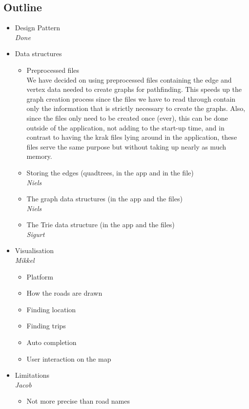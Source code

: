 \documentclass[a4paper,11pt]{article}
\begin{document}
\subsection{Outline}
\begin{itemize}
	\item Design Pattern \\
		\textsl{Done}
	\item Data structures
	\begin{itemize}
		\item Preprocessed files \\
		We have decided on using preprocessed files containing the edge and vertex data needed to create graphs for pathfinding. This speeds up the graph creation process since the files we have to read through contain only the information that is strictly necessary to create the graphs. Also, since the files only need to be created once (ever), this can be done outside of the application, not adding to the start-up time, and in contrast to having the krak files lying around in the application, these files serve the same purpose but without taking up nearly as much memory.
		\item Storing the edges (quadtrees, in the app and in the file) \\
		\textsl{Niels}
		\item The graph data structures (in the app and the files) \\
		\textsl{Niels}
		\item The Trie data structure (in the app and the files) \\
		\textsl{Sigurt}
	\end{itemize}
	\item Visualisation \\
		\textsl{Mikkel}
	\begin{itemize}
		\item Platform
		\item How the roads are drawn
		\item Finding location
		\item Finding trips
		\item Auto completion
		\item User interaction on the map
	\end{itemize}
	\item Limitations \\
		\textsl{Jacob}
	\begin{itemize}
		\item Not more precise than road names
		    

\end{itemize}
\end{itemize}
\end{document}
